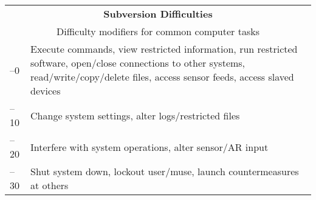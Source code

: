 \begin{table} \begin{tabularx}{\textwidth}{|l|X|} \hline

\multicolumn{2}{|c|}{\textbf{Subversion Difficulties}} \\ \multicolumn{2}{|c|}{Difficulty modifiers for common computer tasks} \\ \hline

\hline

–0 &Execute commands, view restricted information, run restricted software, open/close connections to other systems, read/write/copy/delete files, access sensor feeds, access slaved devices \\ \hline

–10 &Change system settings, alter logs/restricted files \\ \hline

–20 &Interfere with system operations, alter sensor/AR input \\ \hline

–30 &Shut system down, lockout user/muse, launch countermeasures at others \\ \hline

\end{tabularx} \label{tab:subversion-difficulties} \end{table} 




